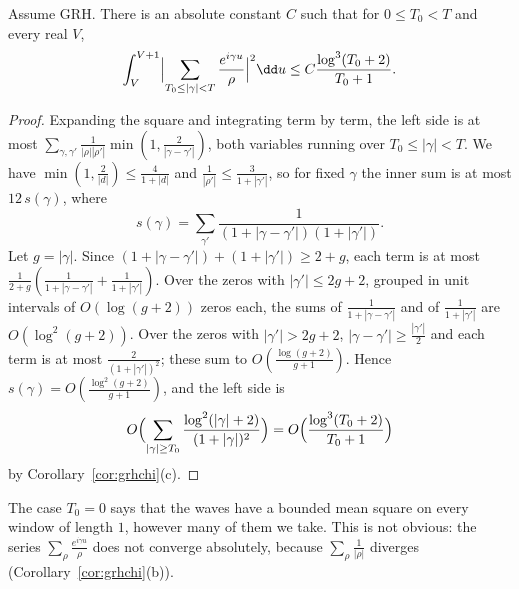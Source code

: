 \begin{lemma}\label{lem:zerowaves}
Assume GRH. There is an absolute constant $C$ such that for $0\le T_0<T$ and every real $V$,
\[
\int_V^{V+1}\Bigl|\sum_{T_0\le|\gamma|<T}\frac{e^{i\gamma u}}\rho\Bigr|^2\dd u\le C\frac{\log^3(T_0+2)}{T_0+1}.
\]
\end{lemma}
\begin{proof}
Expanding the square and integrating term by term, the left side is at most $\sum_{\gamma,\gamma'}\frac1{|\rho||\rho'|}\min(1,\frac2{|\gamma-\gamma'|})$, both variables running over $T_0\le|\gamma|<T$. We have $\min(1,\frac2{|d|})\le\frac4{1+|d|}$ and $\frac1{|\rho'|}\le\frac3{1+|\gamma'|}$, so for fixed $\gamma$ the inner sum is at most $12\,s(\gamma)$, where
\[
s(\gamma)=\sum_{\gamma'}\frac1{(1+|\gamma-\gamma'|)(1+|\gamma'|)}.
\]
Let $g=|\gamma|$. Since $(1+|\gamma-\gamma'|)+(1+|\gamma'|)\ge2+g$, each term is at most $\frac1{2+g}(\frac1{1+|\gamma-\gamma'|}+\frac1{1+|\gamma'|})$. Over the zeros with $|\gamma'|\le2g+2$, grouped in unit intervals of $O(\log(g+2))$ zeros each, the sums of $\frac1{1+|\gamma-\gamma'|}$ and of $\frac1{1+|\gamma'|}$ are $O(\log^2(g+2))$. Over the zeros with $|\gamma'|>2g+2$, $|\gamma-\gamma'|\ge\frac{|\gamma'|}2$ and each term is at most $\frac2{(1+|\gamma'|)^2}$; these sum to $O(\frac{\log(g+2)}{g+1})$. Hence $s(\gamma)=O(\frac{\log^2(g+2)}{g+1})$, and the left side is
\[
O\Bigl(\sum_{|\gamma|\ge T_0}\frac{\log^2(|\gamma|+2)}{(1+|\gamma|)^2}\Bigr)=O\Bigl(\frac{\log^3(T_0+2)}{T_0+1}\Bigr)
\]
by Corollary~\ref{cor:grhchi}(c).
\end{proof}

The case $T_0=0$ says that the waves have a bounded mean square on every window of length $1$, however many of them we take. This is not obvious: the series $\sum_\rho\frac{e^{i\gamma u}}\rho$ does not converge absolutely, because $\sum_\rho\frac1{|\rho|}$ diverges (Corollary~\ref{cor:grhchi}(b)).


